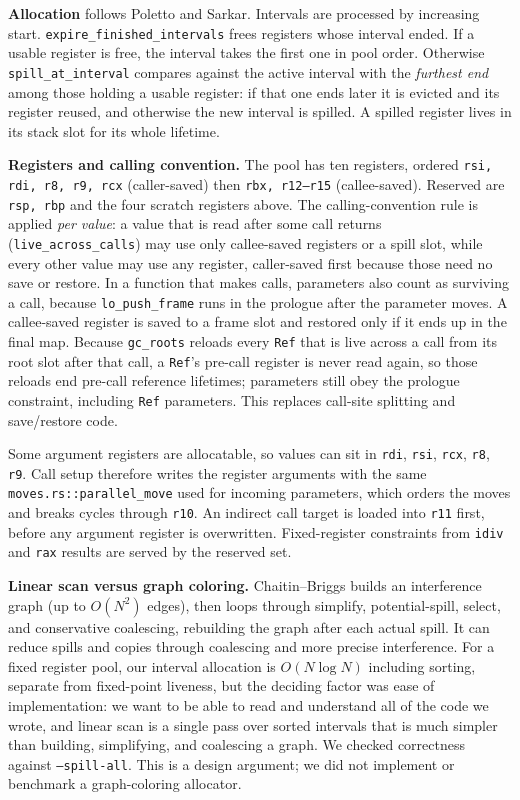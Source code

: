 \documentclass[10pt]{article}
\newcommand{\code}[1]{\texttt{\small #1}}
\begin{document}
\textbf{Allocation} follows Poletto and Sarkar. Intervals are processed by increasing start. \code{expire\_finished\_intervals} frees registers whose interval ended. If a usable register is free, the interval takes the first one in pool order. Otherwise \code{spill\_at\_interval} compares against the active interval with the \emph{furthest end} among those holding a usable register: if that one ends later it is evicted and its register reused, and otherwise the new interval is spilled. A spilled register lives in its stack slot for its whole lifetime.

\textbf{Registers and calling convention.} The pool has ten registers, ordered \code{rsi, rdi, r8, r9, rcx} (caller-saved) then \code{rbx, r12--r15} (callee-saved). Reserved are \code{rsp, rbp} and the four scratch registers above. The calling-convention rule is applied \emph{per value}: a value that is read after some call returns (\code{live\_across\_calls}) may use only callee-saved registers or a spill slot, while every other value may use any register, caller-saved first because those need no save or restore. In a function that makes calls, parameters also count as surviving a call, because \code{lo\_push\_frame} runs in the prologue after the parameter moves. A callee-saved register is saved to a frame slot and restored only if it ends up in the final map. Because \code{gc\_roots} reloads every \code{Ref} that is live across a call from its root slot after that call, a \code{Ref}'s pre-call register is never read again, so those reloads end pre-call reference lifetimes; parameters still obey the prologue constraint, including \code{Ref} parameters. This replaces call-site splitting and save/restore code.

Some argument registers are allocatable, so values can sit in \code{rdi}, \code{rsi}, \code{rcx}, \code{r8}, \code{r9}. Call setup therefore writes the register arguments with the same \code{moves.rs::parallel\_move} used for incoming parameters, which orders the moves and breaks cycles through \code{r10}. An indirect call target is loaded into \code{r11} first, before any argument register is overwritten. Fixed-register constraints from \code{idiv} and \code{rax} results are served by the reserved set.

\textbf{Linear scan versus graph coloring.} Chaitin--Briggs builds an interference graph (up to $O(N^2)$ edges), then loops through simplify, potential-spill, select, and conservative coalescing, rebuilding the graph after each actual spill. It can reduce spills and copies through coalescing and more precise interference. For a fixed register pool, our interval allocation is $O(N\log N)$ including sorting, separate from fixed-point liveness, but the deciding factor was ease of implementation: we want to be able to read and understand all of the code we wrote, and linear scan is a single pass over sorted intervals that is much simpler than building, simplifying, and coalescing a graph. We checked correctness against \code{--spill-all}. This is a design argument; we did not implement or benchmark a graph-coloring allocator.
\end{document}
